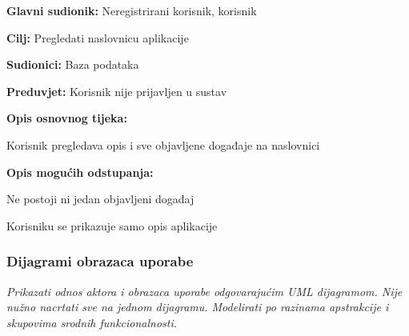 			
				\noindent {}
				\begin{packed_item}
					
					\item \textbf{Glavni sudionik:} Neregistrirani korisnik, korisnik
					\item  \textbf{Cilj:} Pregledati naslovnicu aplikacije
					\item  \textbf{Sudionici:} Baza podataka
					\item  \textbf{Preduvjet:} Korisnik nije prijavljen u sustav
					\item  \textbf{Opis osnovnog tijeka:}
					
					\item[] \begin{packed_enum}
						
						\item Korisnik pregledava opis i sve objavljene događaje na naslovnici
						
					\end{packed_enum}
					
					\item  \textbf{Opis mogućih odstupanja:}
					
					\item[] \begin{packed_item}
						
						\item[1.a] Ne postoji ni jedan objavljeni događaj
						\item[] \begin{packed_enum}
							
							\item Korisniku se prikazuje samo opis aplikacije
							
						\end{packed_enum}
					\end{packed_item}
				\end{packed_item}
				
			
			
				
					
				\subsubsection{Dijagrami obrazaca uporabe}
					
					\textit{Prikazati odnos aktora i obrazaca uporabe odgovarajućim UML dijagramom. Nije nužno nacrtati sve na jednom dijagramu. Modelirati po razinama apstrakcije i skupovima srodnih funkcionalnosti.}
				\eject		
				
